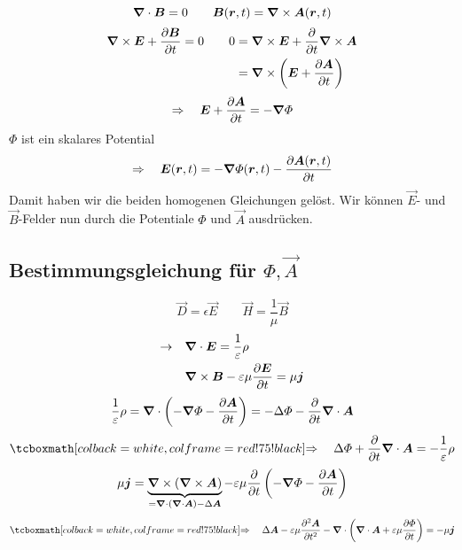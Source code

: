 \begin{equation*}
\bm{\nabla} \cdot \bm{B} = 0 \qquad \bm{B}(\bm{r},t) = \bm{\nabla} \times \bm{A}(\bm{r},t)
\end{equation*}
\begin{align*}
\bm{\nabla} \times \bm{E} + \frac{\partial \bm{B}}{\partial t} = 0 \qquad 0 &= \bm{\nabla} \times \bm{E} + \frac{\partial }{\partial t} \bm{\nabla} \times \bm{A} \\
&= \bm{\nabla} \times \left(\bm{E} + \frac{\partial \bm{A}}{\partial t}\right)
\end{align*}
\begin{equation*}
\Rightarrow \quad \bm{E} + \frac{\partial \bm{A}}{\partial t} = - \bm{\nabla} \varPhi
\end{equation*}
$ \Phi $ ist ein skalares Potential
\begin{equation*}
\Rightarrow \quad \bm{E}(\bm{r},t) = - \bm{\nabla} \varPhi(\bm{r},t) - \frac{\partial \bm{A}(\bm{r},t)}{\partial t}
\end{equation*}
Damit haben wir die beiden homogenen Gleichungen gelöst. Wir können $ \vec{E} $- und $ \vec{B} $-Felder nun durch die Potentiale $ \Phi $ und $ \vec{A} $ ausdrücken.

\subsection{Bestimmungsgleichung für \texorpdfstring{$ \Phi , \vec{A} $}{phi A}}

\begin{equation*}
\vec{D} = \epsilon \vec{E} \qquad \vec{H} = \frac{1}{\mu} \vec{B}
\end{equation*}
\begin{align*}
\rightarrow \quad &\bm{\nabla} \cdot \bm{E} = \frac{1}{\varepsilon} \rho \\
& \bm{\nabla} \times \bm{B} - \varepsilon \mu \frac{\partial \bm{E}}{\partial t} = \mu \bm{j}
\end{align*}
\begin{equation*}
\frac{1}{\varepsilon} \rho = \bm{\nabla} \cdot \left(- \bm{\nabla} \varPhi - \frac{\partial \bm{A}}{\partial t}\right) = - \Delta \varPhi - \frac{\partial }{\partial t} \bm{\nabla} \cdot \bm{A}
\end{equation*}
\begin{equation*}
\rmbox{\Rightarrow \quad \Delta \Phi + \prt{}{t} \vabla \cdot \vec{A} = - \frac{1}{\epsilon} \rho}
\end{equation*}
\begin{equation*}
\mu \bm{j} = \underbrace{\bm{\nabla} \times (\bm{\nabla} \times \bm{A})}_{=\bm{\nabla} \cdot (\bm{\nabla} \cdot \bm{A}) - \Delta \bm{A}} - \varepsilon \mu \frac{\partial }{\partial t} \left(- \bm{\nabla} \varPhi - \frac{\partial \bm{A}}{\partial t}\right)
\end{equation*}
\begin{equation*}
\rmbox{\Rightarrow \quad \Delta \vec{A} - \epsilon \mu \prt{^2 \vec{A}}{t^2} - \vabla \cdot \left(\vabla \cdot \vec{A} + \epsilon \mu \prt{\Phi}{t}\right) = - \mu \vec{j}}
\end{equation*}

